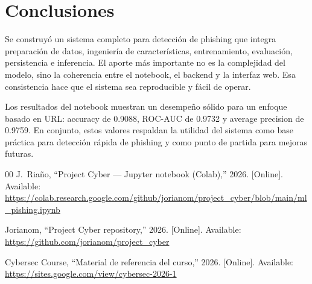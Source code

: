 \documentclass[conference]{IEEEtran}
\begin{document}
\section{Conclusiones}
Se construyó un sistema completo para detección de phishing que integra preparación de datos, ingeniería de características, entrenamiento, evaluación, persistencia e inferencia. El aporte más importante no es la complejidad del modelo, sino la coherencia entre el notebook, el backend y la interfaz web. Esa consistencia hace que el sistema sea reproducible y fácil de operar.

Los resultados del notebook muestran un desempeño sólido para un enfoque basado en URL: accuracy de 0.9088, ROC-AUC de 0.9732 y average precision de 0.9759. En conjunto, estos valores respaldan la utilidad del sistema como base práctica para detección rápida de phishing y como punto de partida para mejoras futuras.

\begin{thebibliography}{00}
J.~Riaño, ``Project Cyber — Jupyter notebook (Colab),'' 2026. [Online]. Available: \url{https://colab.research.google.com/github/jorianom/project_cyber/blob/main/ml_pishing.ipynb}

Jorianom, ``Project Cyber repository,'' 2026. [Online]. Available: \url{https://github.com/jorianom/project_cyber}

Cybersec Course, ``Material de referencia del curso,'' 2026. [Online]. Available: \url{https://sites.google.com/view/cybersec-2026-1}
\end{thebibliography}
\end{document}
